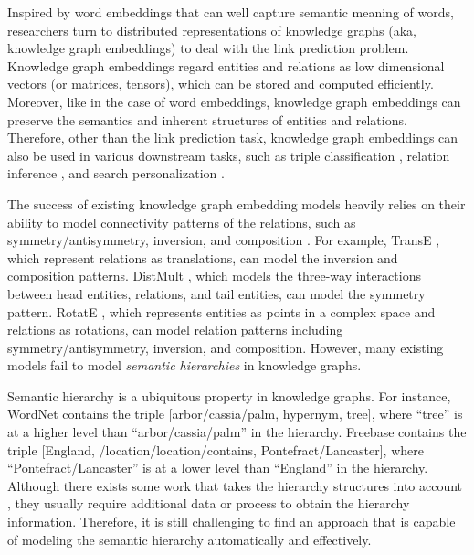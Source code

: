 \documentclass[letterpaper]{article} \usepackage{aaai20}  \usepackage{times}  \usepackage{helvet} \usepackage{courier}  \usepackage[hyphens]{url}  \usepackage{graphicx} \urlstyle{rm} \def\UrlFont{\rm}  \usepackage{graphicx}  \frenchspacing  \setlength{\pdfpagewidth}{8.5in}  \setlength{\pdfpageheight}{11in}
\newcommand{\citep}{\cite}
\begin{document}
Inspired by word embeddings \citep{word2vec} that can well capture semantic meaning of words, researchers turn to distributed representations of knowledge graphs (aka, knowledge graph embeddings) to deal with the link prediction problem. Knowledge graph embeddings regard entities and relations as low dimensional vectors (or matrices, tensors), which can be stored and computed efficiently. Moreover, like in the case of word embeddings, knowledge graph embeddings can preserve the semantics and inherent structures of entities and relations. Therefore, other than the link prediction task, knowledge graph embeddings can also be used in various downstream tasks, such as triple classification \citep{transr}, relation inference \citep{RSN}, and search personalization \citep{capse}. 


The success of existing knowledge graph embedding models heavily relies on their ability to model connectivity patterns of the relations, such as symmetry/antisymmetry, inversion, and composition  \citep{rotate}. For example, TransE \citep{transe},
which represent relations as translations, can model the inversion and composition patterns. DistMult \citep{distmult}, which models the three-way interactions between head entities, relations, and tail entities, can model the symmetry pattern. RotatE \citep{rotate}, which represents entities as points in a complex space and relations as rotations, can model relation patterns including symmetry/antisymmetry, inversion, and composition.
However, many existing models fail to model \textit{semantic hierarchies} in knowledge graphs. 


Semantic hierarchy is a ubiquitous property in knowledge graphs. For instance, WordNet \citep{wordnet} contains the triple [arbor/cassia/palm, hypernym, tree], where ``tree'' is at a higher level than ``arbor/cassia/palm'' in the hierarchy. Freebase \citep{freebase} contains the triple [England, /location/location/contains, Pontefract/Lancaster], where ``Pontefract/Lancaster'' is at a lower level than ``England'' in the hierarchy. Although there exists some work that takes the hierarchy structures into account \citep{hType,hRel}, they usually require additional data or process to obtain the hierarchy information. Therefore, it is still challenging to find an approach that is capable of modeling the semantic hierarchy automatically and effectively.
\end{document}

